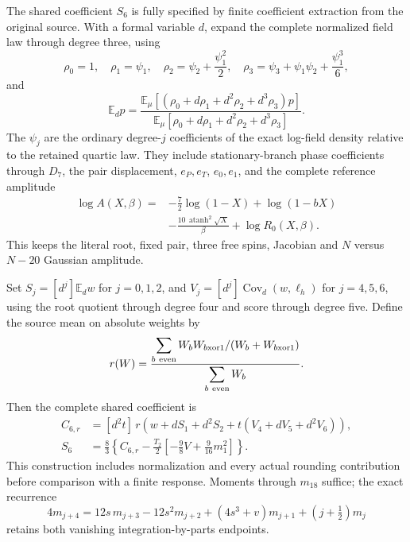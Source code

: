 The shared coefficient $S_6$ is fully specified by finite coefficient extraction from the original source. With a formal variable $d$, expand the complete normalized field law through degree three, using
\begin{equation}
 \rho_0=1,\quad \rho_1=\psi_1,\quad
 \rho_2=\psi_2+\frac{\psi_1^2}{2},\quad
 \rho_3=\psi_3+\psi_1\psi_2+\frac{\psi_1^3}{6},
\end{equation}
and
\begin{equation}
 \mathbb E_d p=
 \frac{\mathbb E_\mu[(\rho_0+d\rho_1+d^2\rho_2+d^3\rho_3)p]}
 {\mathbb E_\mu[\rho_0+d\rho_1+d^2\rho_2+d^3\rho_3]}.
\end{equation}
The $\psi_j$ are the ordinary degree-$j$ coefficients of the exact log-field density relative to the retained quartic law. They include stationary-branch phase coefficients through $D_7$, the pair displacement, $e_P,e_T$, $e_0,e_1$, and the complete reference amplitude
\begin{equation}
\begin{aligned}
 \log A(X,\beta)={}&-\frac72\log(1-X)+\log(1-bX)\\
 &-\frac{10\,\operatorname{atanh}^2\sqrt X}{\beta}
 +\log R_0(X,\beta).
\end{aligned}
\end{equation}
This keeps the literal root, fixed pair, three free spins, Jacobian and $N$ versus $N-20$ Gaussian amplitude.

Set $S_j=[d^j]\mathbb E_dw$ for $j=0,1,2$, and
$V_j=[d^j]\operatorname{Cov}_d(w,\ell_h)$ for $j=4,5,6$, using the root quotient through degree four and score through degree five. Define the source mean on absolute weights by
\begin{equation}
 r(W)=
 \frac{\displaystyle\sum_{b\ {\rm even}}
 W_bW_{b\mathbin{\mathrm{xor}}1}/(W_b+W_{b\mathbin{\mathrm{xor}}1})}
 {\displaystyle\sum_{b\ {\rm even}}W_b}.
\end{equation}
Then the complete shared coefficient is
\begin{align}
 C_{6,r}&=[d^2t]\,
 r\!\left(w+dS_1+d^2S_2+t(V_4+dV_5+d^2V_6)\right),\\
 S_6&=\frac83\left\{C_{6,r}
 -\frac{T_2}{2}\left[-\frac98V+\frac9{16}m_1^2\right]\right\}.
\end{align}
This construction includes normalization and every actual rounding contribution before comparison with a finite response. Moments through $m_{18}$ suffice; the exact recurrence
\begin{equation}
 4m_{j+4}=12s\,m_{j+3}-12s^2m_{j+2}
 +(4s^3+v)m_{j+1}+(j+\tfrac12)m_j
\end{equation}
retains both vanishing integration-by-parts endpoints.

